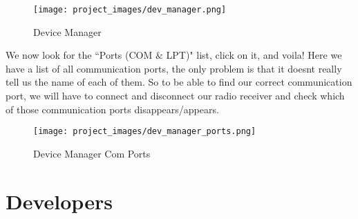	\begin{figure}[H]
	\centering
	\texttt{[image: project\_images/dev\_manager.png]}
	 \caption{Device Manager}
	 \label{fig:dev_manager}
	\end{figure}

We now look for the ``Ports (COM $\&$ LPT)" list, click on it, and voila! Here we have a list of all communication ports, the only problem is that it doesnt really tell us the name of each of them. So to be able to find our correct communication port, we will have to connect and disconnect our radio receiver and check which of those communication ports disappears/appears.

	\begin{figure}[H]
	\centering
	\texttt{[image: project\_images/dev\_manager\_ports.png]}
	 \caption{Device Manager Com Ports}
	 \label{fig:dev_manager_ports}
	\end{figure}
\newpage
\section{Developers}
